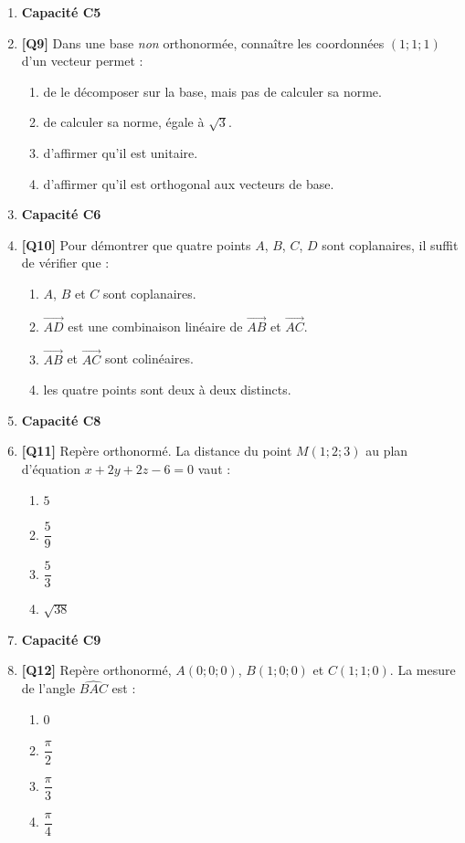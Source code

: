 \begin{enumerate}
\item[] \textbf{Capacité C5}

\item \textbf{[Q9]} Dans une base \emph{non} orthonormée, connaître les coordonnées $(1;1;1)$ d'un vecteur permet :
  \begin{enumerate}[label=\Alph*.]
    \item de le décomposer sur la base, mais pas de calculer sa norme.
    \item de calculer sa norme, égale à $\sqrt{3}$.
    \item d'affirmer qu'il est unitaire.
    \item d'affirmer qu'il est orthogonal aux vecteurs de base.
  \end{enumerate}

\item[] \textbf{Capacité C6}

\item \textbf{[Q10]} Pour démontrer que quatre points $A$, $B$, $C$, $D$ sont coplanaires, il suffit de vérifier que :
  \begin{enumerate}[label=\Alph*.]
    \item $A$, $B$ et $C$ sont coplanaires.
    \item $\vec{AD}$ est une combinaison linéaire de $\vec{AB}$ et $\vec{AC}$.
    \item $\vec{AB}$ et $\vec{AC}$ sont colinéaires.
    \item les quatre points sont deux à deux distincts.
  \end{enumerate}

\item[] \textbf{Capacité C8}

\item \textbf{[Q11]} Repère orthonormé. La distance du point $M(1;2;3)$ au plan d'équation $x+2y+2z-6=0$ vaut :
  \begin{enumerate}[label=\Alph*.]
    \item $5$
    \item $\dfrac{5}{9}$
    \item $\dfrac{5}{3}$
    \item $\sqrt{38}$
  \end{enumerate}

\item[] \textbf{Capacité C9}

\item \textbf{[Q12]} Repère orthonormé, $A(0;0;0)$, $B(1;0;0)$ et $C(1;1;0)$. La mesure de l'angle $\widehat{BAC}$ est :
  \begin{enumerate}[label=\Alph*.]
    \item $0$
    \item $\dfrac{\pi}{2}$
    \item $\dfrac{\pi}{3}$
    \item $\dfrac{\pi}{4}$
  \end{enumerate}


\end{enumerate}
